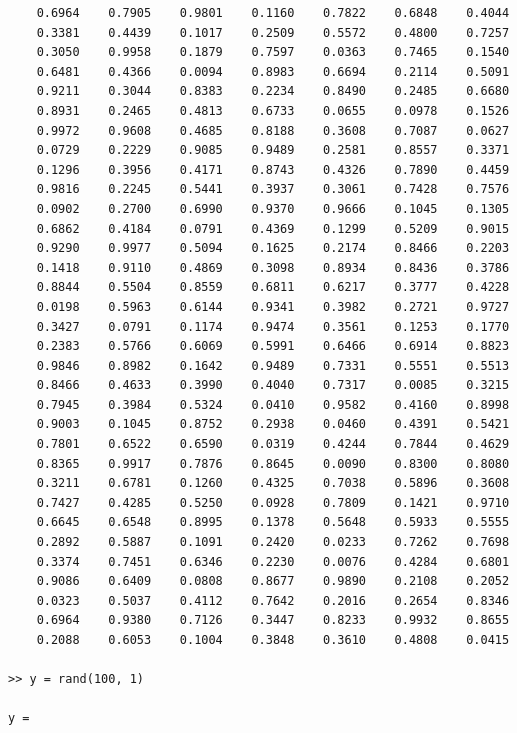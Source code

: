 \documentclass[11pt, oneside]{article}   	%
\begin{document}
\begin{verbatim}
    0.6964    0.7905    0.9801    0.1160    0.7822    0.6848    0.4044
    0.3381    0.4439    0.1017    0.2509    0.5572    0.4800    0.7257
    0.3050    0.9958    0.1879    0.7597    0.0363    0.7465    0.1540
    0.6481    0.4366    0.0094    0.8983    0.6694    0.2114    0.5091
    0.9211    0.3044    0.8383    0.2234    0.8490    0.2485    0.6680
    0.8931    0.2465    0.4813    0.6733    0.0655    0.0978    0.1526
    0.9972    0.9608    0.4685    0.8188    0.3608    0.7087    0.0627
    0.0729    0.2229    0.9085    0.9489    0.2581    0.8557    0.3371
    0.1296    0.3956    0.4171    0.8743    0.4326    0.7890    0.4459
    0.9816    0.2245    0.5441    0.3937    0.3061    0.7428    0.7576
    0.0902    0.2700    0.6990    0.9370    0.9666    0.1045    0.1305
    0.6862    0.4184    0.0791    0.4369    0.1299    0.5209    0.9015
    0.9290    0.9977    0.5094    0.1625    0.2174    0.8466    0.2203
    0.1418    0.9110    0.4869    0.3098    0.8934    0.8436    0.3786
    0.8844    0.5504    0.8559    0.6811    0.6217    0.3777    0.4228
    0.0198    0.5963    0.6144    0.9341    0.3982    0.2721    0.9727
    0.3427    0.0791    0.1174    0.9474    0.3561    0.1253    0.1770
    0.2383    0.5766    0.6069    0.5991    0.6466    0.6914    0.8823
    0.9846    0.8982    0.1642    0.9489    0.7331    0.5551    0.5513
    0.8466    0.4633    0.3990    0.4040    0.7317    0.0085    0.3215
    0.7945    0.3984    0.5324    0.0410    0.9582    0.4160    0.8998
    0.9003    0.1045    0.8752    0.2938    0.0460    0.4391    0.5421
    0.7801    0.6522    0.6590    0.0319    0.4244    0.7844    0.4629
    0.8365    0.9917    0.7876    0.8645    0.0090    0.8300    0.8080
    0.3211    0.6781    0.1260    0.4325    0.7038    0.5896    0.3608
    0.7427    0.4285    0.5250    0.0928    0.7809    0.1421    0.9710
    0.6645    0.6548    0.8995    0.1378    0.5648    0.5933    0.5555
    0.2892    0.5887    0.1091    0.2420    0.0233    0.7262    0.7698
    0.3374    0.7451    0.6346    0.2230    0.0076    0.4284    0.6801
    0.9086    0.6409    0.0808    0.8677    0.9890    0.2108    0.2052
    0.0323    0.5037    0.4112    0.7642    0.2016    0.2654    0.8346
    0.6964    0.9380    0.7126    0.3447    0.8233    0.9932    0.8655
    0.2088    0.6053    0.1004    0.3848    0.3610    0.4808    0.0415

>> y = rand(100, 1)

y =


\end{verbatim}
\end{document}

